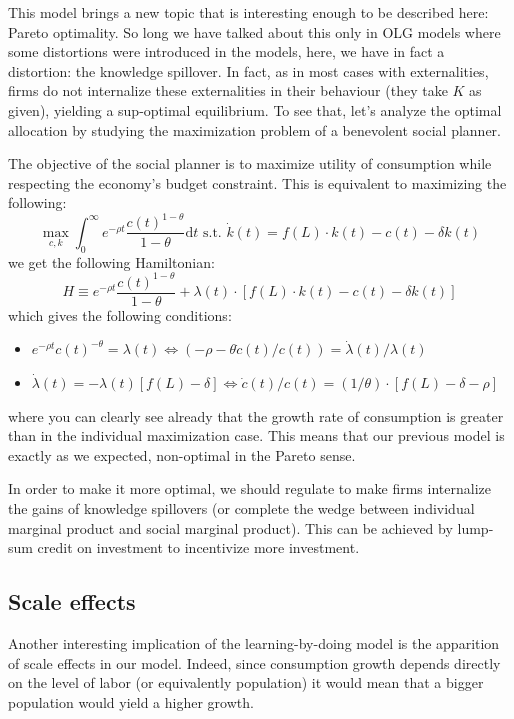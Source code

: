 \documentclass[12pt]{report}
\def\D{\mathrm{d}}
\begin{document}
This model brings a new topic that is interesting enough to be described here: Pareto optimality. So long we have talked about this only in OLG models where some distortions were introduced in the models, here, we have in fact a distortion: the knowledge spillover. In fact, as in most cases with externalities, firms do not internalize these externalities in their behaviour (they take $K$ as given), yielding a sup-optimal equilibrium. To see that, let's analyze the optimal allocation by studying the maximization problem of a benevolent social planner.

The objective of the social planner is to maximize utility of consumption while respecting the economy's budget constraint. This is equivalent to maximizing the following: $$\max_{c, k} \int_0^\infty e^{-\rho t} \frac{c(t)^{1-\theta}}{1 - \theta}\D t \text{ s.t. } \dot k(t) = f(L)\cdot k(t) - c(t) - \delta k(t) $$ we get the following Hamiltonian: $$H\equiv e^{-\rho t} \frac{c(t)^{1-\theta}}{1 - \theta} + \lambda(t) \cdot [f(L)\cdot k(t) - c(t) - \delta k(t)] $$ which gives the following conditions:\begin{itemize}
\item $ e^{-\rho t} c(t)^{-\theta} = \lambda(t) \Leftrightarrow (-\rho - \theta \dot c(t)/c(t)) = \dot \lambda (t)/ \lambda(t)$
\item  $\dot \lambda(t) = - \lambda(t)[f(L) - \delta] \Leftrightarrow  \dot c(t)/c(t) = (1/\theta)\cdot [f(L) - \delta -\rho] $
\end{itemize} where you can clearly see already that the growth rate of consumption is greater than in the individual maximization case. This means that our previous model is exactly as we expected, non-optimal in the Pareto sense.

In order to make it more optimal, we should regulate to make firms internalize the gains of knowledge spillovers (or complete the wedge between individual marginal product and social marginal product). This can be achieved by lump-sum credit on investment to incentivize more investment.

\subsection{Scale effects}

Another interesting implication of the learning-by-doing model is the apparition of scale effects in our model. Indeed, since consumption growth depends directly on the level of labor (or equivalently population) it would mean that a bigger population would yield a higher growth.
\end{document}
